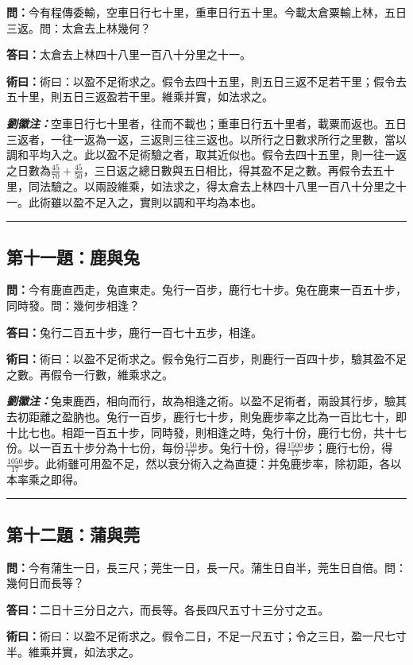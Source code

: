 \documentclass[11pt,a4paper]{article}
\newcommand{\wen}[1]{\textbf{\color{problemcolor}問：}#1\par}
\newcommand{\da}[1]{\textbf{答曰：}#1\par}
\newcommand{\shu}[1]{\textbf{術曰：}#1\par}
\newcommand{\liuhui}[1]{{\color{commentarycolor}\textit{\textbf{劉徽注：}}#1\par}}
\begin{document}
\wen{今有程傳委輸，空車日行七十里，重車日行五十里。今載太倉粟輸上林，五日三返。問：太倉去上林幾何？}

\da{太倉去上林四十八里一百八十分里之十一。}

\shu{術曰：以盈不足術求之。假令去四十五里，則五日三返不足若干里；假令去五十里，則五日三返盈若干里。維乘并實，如法求之。}

\liuhui{空車日行七十里者，往而不載也；重車日行五十里者，載粟而返也。五日三返者，一往一返為一返，三返則三往三返也。以所行之日數求所行之里數，當以調和平均入之。此以盈不足術驗之者，取其近似也。假令去四十五里，則一往一返之日數為$\frac{45}{70} + \frac{45}{50}$，三日返之總日數與五日相比，得其盈不足之數。再假令去五十里，同法驗之。以兩設維乘，如法求之，得太倉去上林四十八里一百八十分里之十一。此術雖以盈不足入之，實則以調和平均為本也。}

\bigskip
\hrule
\bigskip

\subsection{第十一題：鹿與兔}

\wen{今有鹿直西走，兔直東走。兔行一百步，鹿行七十步。兔在鹿東一百五十步，同時發。問：幾何步相逢？}

\da{兔行二百五十步，鹿行一百七十五步，相逢。}

\shu{術曰：以盈不足術求之。假令兔行二百步，則鹿行一百四十步，驗其盈不足之數。再假令一行數，維乘求之。}

\liuhui{兔東鹿西，相向而行，故為相逢之術。以盈不足術者，兩設其行步，驗其去初距離之盈肭也。兔行一百步，鹿行七十步，則兔鹿步率之比為一百比七十，即十比七也。相距一百五十步，同時發，則相逢之時，兔行十份，鹿行七份，共十七份。以一百五十步分為十七份，每份$\frac{150}{17}$步。兔行十份，得$\frac{1500}{17}$步；鹿行七份，得$\frac{1050}{17}$步。此術雖可用盈不足，然以衰分術入之為直捷：并兔鹿步率，除初距，各以本率乘之即得。}

\bigskip
\hrule
\bigskip

\subsection{第十二題：蒲與莞}

\wen{今有蒲生一日，長三尺；莞生一日，長一尺。蒲生日自半，莞生日自倍。問：幾何日而長等？}

\da{二日十三分日之六，而長等。各長四尺五寸十三分寸之五。}

\shu{術曰：以盈不足術求之。假令二日，不足一尺五寸；令之三日，盈一尺七寸半。維乘并實，如法求之。}
\end{document}
